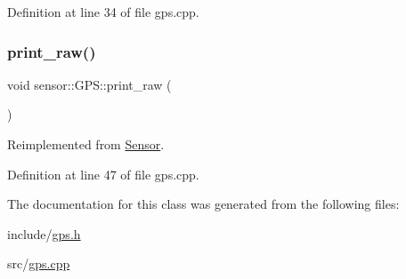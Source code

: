 Definition at line 34 of file gps.\+cpp.

\mbox{\label{classsensor_1_1_g_p_s_a8b0dfe608735ccca47bae8e9a41e1298}} 
\subsubsection{\texorpdfstring{print\+\_\+raw()}{print\_raw()}}
{\footnotesize\ttfamily void sensor\+::\+G\+P\+S\+::print\+\_\+raw (\begin{DoxyParamCaption}{ }\end{DoxyParamCaption})\hspace{0.3cm}{\ttfamily [virtual]}}



Reimplemented from \hyperlink{class_sensor_a6f16371eb71419f49ea1363ca81d0755}{Sensor}.



Definition at line 47 of file gps.\+cpp.



The documentation for this class was generated from the following files\+:\begin{DoxyCompactItemize}
\item 
include/\hyperlink{gps_8h}{gps.\+h}\item 
src/\hyperlink{gps_8cpp}{gps.\+cpp}\end{DoxyCompactItemize}
